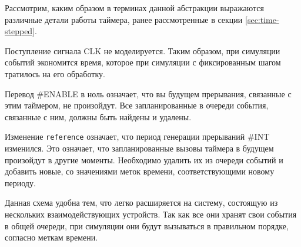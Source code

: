 Рассмотрим, каким образом в терминах данной абстракции выражаются различные детали работы таймера, ранее рассмотренные в секции \ref{sec:time-stepped}.
\begin{itemize*}
    \item Поступление сигнала CLK не моделируется. Таким образом, при симуляции событий экономится время, которое при симуляции с фиксированным шагом тратилось на его обработку.
    \item Перевод \#ENABLE в ноль означает, что вы будущем прерывания, связанные с этим таймером, не произойдут. Все запланированные в очереди события, связанные с ним, должны быть найдены и удалены.
    \item Изменение \texttt{reference} означает, что период генерации прерываний \#INT изменился. Это означает, что  запланированные вызовы таймера в будущем произойдут в другие моменты. Необходимо удалить их из очереди событий и добавить новые, со значениями меток времени, соответствующими новому периоду.
\end{itemize*}

Данная схема удобна тем, что легко расширяется на систему, состоящую из нескольких взаимодействующих устройств. Так как все они хранят свои события в общей очереди, при симуляции они будут вызываться в правильном порядке, согласно меткам времени.

